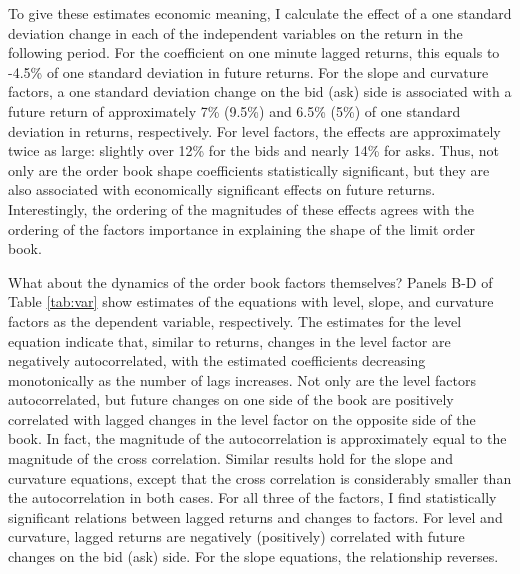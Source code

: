	To give these estimates economic meaning, I calculate the effect of a one standard deviation change in each of the independent variables on the return in the following period. For the coefficient on one minute lagged returns, this equals to -4.5\% of one standard deviation in future returns. For the slope and curvature factors, a one standard deviation change on the bid (ask) side is associated with a future return of approximately 7\% (9.5\%) and 6.5\% (5\%) of one standard deviation in returns, respectively. For level factors, the effects are approximately twice as large: slightly over 12\% for the bids and nearly 14\% for asks. Thus, not only are the order book shape coefficients statistically significant, but they are also associated with economically significant effects on future returns. Interestingly, the ordering of the magnitudes of these effects agrees with the ordering of the factors importance in explaining the shape of the limit order book.

	What about the dynamics of the order book factors themselves? Panels B-D of Table \ref{tab:var} show estimates of the equations with level, slope, and curvature factors as the dependent variable, respectively. The estimates for the level equation indicate that, similar to returns, changes in the level factor are negatively autocorrelated, with the estimated coefficients decreasing monotonically as the number of lags increases. Not only are the level factors autocorrelated, but future changes on one side of the book are positively correlated with lagged changes in the level factor on the opposite side of the book. In fact, the magnitude of the autocorrelation is approximately equal to the magnitude of the cross correlation. Similar results hold for the slope and curvature equations, except that the cross correlation is considerably smaller than the autocorrelation in both cases. For all three of the factors, I find statistically significant relations between lagged returns and changes to factors. For level and curvature, lagged returns are negatively (positively) correlated with future changes on the bid (ask) side. For the slope equations, the relationship reverses.

